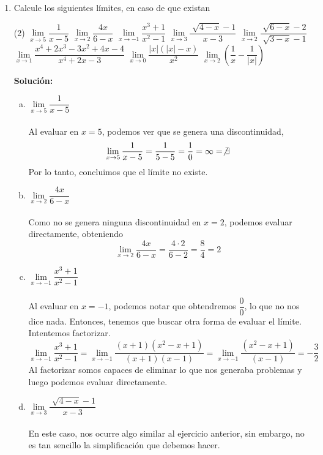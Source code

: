 \documentclass[12pt]{article}
\newenvironment{solucion}
{\begin{mdframed}[backgroundcolor=black!10]
		{\bf Solución:}\\
	}
	{
	\end{mdframed}
}
\newenvironment{preguntas}
{\begin{enumerate}\itemsep12pt
	}
	{
	\end{enumerate}
}
\newcommand{\ra}{\rightarrow}
\begin{document}
\begin{preguntas}
\item Calcule los siguientes límites, en caso de que existan
\begin{tasks}(2)
\task $\lim\limits_{x \ra 5} \dfrac{1}{x-5}$ 
\task $\lim\limits_{x \ra 2} \dfrac{4x}{6-x}$
\task $\lim\limits_{x \ra -1} \dfrac{x^3+1}{x^2-1}$
\task $\lim\limits_{x \ra 3} \dfrac{\sqrt[]{4-x}-1}{x-3}$
\task $\lim\limits_{x \ra 2} \dfrac{\sqrt[]{6-x}-2}{\sqrt[]{3-x}-1}$
\task $\lim\limits_{x \ra 1} \dfrac{x^4+2x^3-3x^2+4x-4}{x^4+2x-3}$
\task $\lim\limits_{x \ra 0} \dfrac{|x|(|x|-x)}{x^2}$
\task $\lim\limits_{x \ra 2}\left(\dfrac{1}{x}-\dfrac{1}{|x|}\right)$
\end{tasks}
\begin{solucion}

\begin{enumerate}[a)]
\item $\lim\limits_{x \ra 5} \dfrac{1}{x-5}$\\
\\
Al evaluar en $x = 5$, podemos ver que se genera una discontinuidad,
$$\lim\limits_{x \ra 5} \dfrac{1}{x-5} = \dfrac{1}{5-5} = \dfrac{1}{0} = \infty = \not\exists$$
Por lo tanto, concluimos que el límite no existe.
\item $\lim\limits_{x \ra 2} \dfrac{4x}{6-x}$\\
\\
Como no se genera ninguna discontinuidad en $x = 2$, podemos evaluar directamente, obteniendo
$$\lim\limits_{x \ra 2} \dfrac{4x}{6-x} = \dfrac{4 \cdot 2}{6-2} = \dfrac{8}{4} = 2$$
\item $\lim\limits_{x \ra -1} \dfrac{x^3+1}{x^2-1}$\\
\\
Al evaluar en $x = -1$, podemos notar que obtendremos $\dfrac{0}{0}$, lo que no nos dice nada. Entonces, tenemos que buscar otra forma de evaluar el límite. Intentemos factorizar.
$$\lim\limits_{x \ra -1} \dfrac{x^3+1}{x^2-1} = \lim\limits_{x \ra -1} \dfrac{(x+1)(x^2-x+1)}{(x+1)(x-1)} = \lim\limits_{x \ra -1} \dfrac{(x^2-x+1)}{(x-1)} = -\dfrac{3}{2}$$
Al factorizar somos capaces de eliminar lo que nos generaba problemas y luego podemos evaluar directamente.
\item $\lim\limits_{x \ra 3} \dfrac{\sqrt[]{4-x}-1}{x-3}$\\
\\
En este caso, nos ocurre algo similar al ejercicio anterior, sin embargo, no es tan sencillo la simplificación que debemos hacer. \\

\end{enumerate}
\end{solucion}
\end{preguntas}
\end{document}
